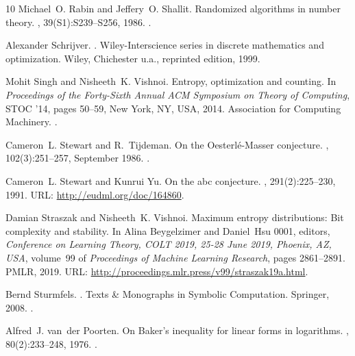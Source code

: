 \documentclass[10pt,a4paper]{article}
\theoremstyle{definition}
\numberwithin{equation}{section}
\begin{document}
\begin{thebibliography}{10}
Michael~O. Rabin and Jeffery~O. Shallit.
\newblock Randomized algorithms in number theory.
,
  39(S1):S239--S256, 1986.
\newblock \href {https://doi.org/https://doi.org/10.1002/cpa.3160390713}
  {}.

Alexander Schrijver.
.
\newblock Wiley-Interscience series in discrete mathematics and optimization.
  Wiley, Chichester u.a., reprinted edition, 1999.

Mohit Singh and Nisheeth~K. Vishnoi.
\newblock Entropy, optimization and counting.
\newblock In {\em Proceedings of the Forty-Sixth Annual ACM Symposium on Theory
  of Computing}, STOC '14, pages 50--59, New York, NY, USA, 2014. Association
  for Computing Machinery.
\newblock \href {https://doi.org/10.1145/2591796.2591803}
  {}.

Cameron~L. Stewart and R.~Tijdeman.
\newblock On the {Oesterl\'{e}}-{Masser} conjecture.
, 102(3):251--257, September
  1986.
\newblock \href {https://doi.org/10.1007/BF01294603}
  {}.

Cameron~L. Stewart and Kunrui Yu.
\newblock On the abc conjecture.
, 291(2):225--230, 1991.
\newblock URL: \url{http://eudml.org/doc/164860}.

Damian Straszak and Nisheeth~K. Vishnoi.
\newblock Maximum entropy distributions: Bit complexity and stability.
\newblock In Alina Beygelzimer and Daniel~Hsu 0001, editors, {\em Conference on
  Learning Theory, COLT 2019, 25-28 June 2019, Phoenix, AZ, USA}, volume~99 of
  {\em Proceedings of Machine Learning Research}, pages 2861--2891. PMLR, 2019.
\newblock URL: \url{http://proceedings.mlr.press/v99/straszak19a.html}.

Bernd Sturmfels.
.
\newblock Texts {\&} Monographs in Symbolic Computation. Springer, 2008.
\newblock \href {https://doi.org/10.1007/978-3-211-77417-5}
  {}.

Alfred~J. van~der Poorten.
\newblock On {B}aker's inequality for linear forms in logarithms.
, 80(2):233--248, 1976.
\newblock \href {https://doi.org/10.1017/S0305004100052877}
  {}.


\end{thebibliography}
\end{document}
